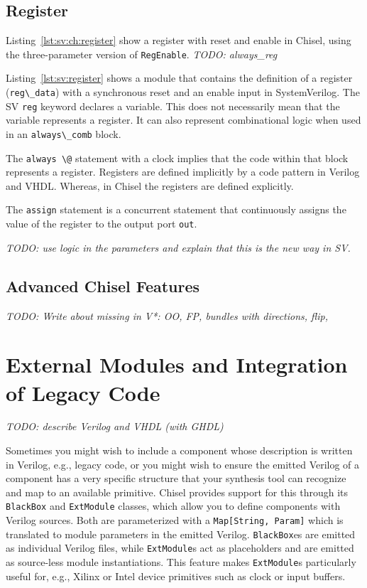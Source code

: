 \documentclass[%
    10pt,
    headinclude, footexclude,
    openright, %
    notitlepage,
    cleardoubleempty,
    headsepline,
    pointlessnumbers,
    bibtotoc, idxtotoc,
    ]{scrbook}
\newcommand{\code}[1]{{\lstinline[basicstyle=\small\ttfamily]{#1}}}
\newcommand{\todo}[1]{{\emph{TODO: #1}}}
\begin{document}
\subsection{Register}


Listing~\ref{lst:sv:ch:register} show a register with reset and enable in Chisel, using
the three-parameter version of \code{RegEnable}.
\todo{always\_reg}


Listing~\ref{lst:sv:register} shows a module that contains the definition of a
register (\code{reg\_data}) with a synchronous reset and an enable input in SystemVerilog.
The SV \code{reg} keyword declares a variable. This does not necessarily mean
that the variable represents a register. It can also represent combinational logic
when used in an \code{always\_comb} block.

The \code{always \@} statement with a clock implies that the code within that block
represents a register. Registers are defined implicitly by a code pattern in Verilog
and VHDL. Whereas, in Chisel the registers are defined explicitly.

The \code{assign} statement is a concurrent statement that continuously
assigns the value of the register to the output port \code{out}.




\todo{use logic in the parameters and explain that this is the new way in SV.}

\subsection{Advanced Chisel Features}

\todo{Write about missing in V*: OO, FP, bundles with directions, flip, }

\section{External Modules and Integration of Legacy Code}

\todo{describe Verilog and VHDL (with GHDL)}

Sometimes you might wish to include a component whose description is
written in Verilog, e.g., legacy code, or you might wish to ensure the emitted Verilog of a component
has a very specific structure that your synthesis tool can recognize and map to an
available primitive. Chisel provides support for this through its \code{BlackBox} and
\code{ExtModule} classes, which allow you to define components with Verilog sources.
Both are parameterized with a \code{Map[String, Param]} which is translated to module
parameters in the emitted Verilog. \code{BlackBox}es are emitted as individual Verilog
files, while \code{ExtModule}s act as placeholders and are emitted as source-less module
instantiations. This feature makes \code{ExtModule}s particularly useful for, e.g.,
Xilinx or Intel device primitives such as clock or input buffers.
\end{document}

